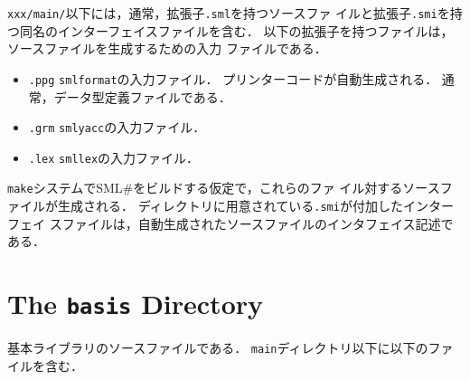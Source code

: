 \documentclass{jbook}
\newcommand{\txt}[2]{#2}
\newcommand{\smlsharp}{SML\#}
\newcommand{\code}[1]{\mbox{\large\tt #1}}
\begin{document}
	\code{xxx/main/}以下には，通常，拡張子\code{.sml}を持つソースファ
イルと拡張子\code{.smi}を持つ同名のインターフェイスファイルを含む．
	以下の拡張子を持つファイルは，ソースファイルを生成するための入力
ファイルである．
\begin{itemize}
\item \code{.ppg} \code{smlformat}の入力ファイル．
	プリンターコードが自動生成される．
	通常，データ型定義ファイルである．
\item \code{.grm} \code{smlyacc}の入力ファイル．
\item \code{.lex} \code{smllex}の入力ファイル．
\end{itemize}
	\code{make}システムで\smlsharp{}をビルドする仮定で，これらのファ
イル対するソースファイルが生成される．
	ディレクトリに用意されている\code{.smi}が付加したインターフェイ
スファイルは，自動生成されたソースファイルのインタフェイス記述である．
\fi%

\section{\txt{\code{basis}ディレクトリ}{The \code{basis} Directory}}
\ifjp%
	基本ライブラリのソースファイルである．
	\code{main}ディレクトリ以下に以下のファイルを含む．
\end{document}

